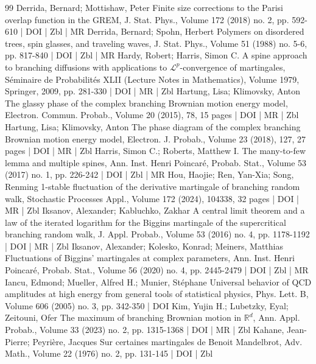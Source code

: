 \documentclass[10pt]{amsart}
\theoremstyle{definition}\newtheorem{defi}[theo]{Definition}\newtheorem{rema}[theo]{Remark}\newtheorem{exam}[theo]{Example}\newtheorem{exem}[theo]{Example}\newtheorem{nota}[theo]{Notation}
\newcommand\1{\mathds{1}}
\begin{document}
\begin{thebibliography}{99}
 Derrida, Bernard; Mottishaw, Peter Finite size corrections to the Parisi overlap function in the GREM, J. Stat. Phys., Volume 172 (2018) no. 2, pp. 592-610 | DOI | Zbl | MR
 Derrida, Bernard; Spohn, Herbert Polymers on disordered trees, spin glasses, and traveling waves, J. Stat. Phys., Volume 51 (1988) no. 5-6, pp. 817-840 | DOI | Zbl | MR
 Hardy, Robert; Harris, Simon C. A spine approach to branching diffusions with applications to $\mathscr{L}^p$-convergence of martingales, Séminaire de Probabilités XLII (Lecture Notes in Mathematics), Volume 1979, Springer, 2009, pp. 281-330 | DOI | MR | Zbl
 Hartung, Lisa; Klimovsky, Anton The glassy phase of the complex branching Brownian motion energy model, Electron. Commun. Probab., Volume 20 (2015), 78, 15 pages | DOI | MR | Zbl
 Hartung, Lisa; Klimovsky, Anton The phase diagram of the complex branching Brownian motion energy model, Electron. J. Probab., Volume 23 (2018), 127, 27 pages | DOI | MR | Zbl
 Harris, Simon C.; Roberts, Matthew I. The many-to-few lemma and multiple spines, Ann. Inst. Henri Poincaré, Probab. Stat., Volume 53 (2017) no. 1, pp. 226-242 | DOI | Zbl | MR
 Hou, Haojie; Ren, Yan-Xia; Song, Renming 1-stable fluctuation of the derivative martingale of branching random walk, Stochastic Processes Appl., Volume 172 (2024), 104338, 32 pages | DOI | MR | Zbl
 Iksanov, Alexander; Kabluchko, Zakhar A central limit theorem and a law of the iterated logarithm for the Biggins martingale of the supercritical branching random walk, J. Appl. Probab., Volume 53 (2016) no. 4, pp. 1178-1192 | DOI | MR | Zbl
 Iksanov, Alexander; Kolesko, Konrad; Meiners, Matthias Fluctuations of Biggins’ martingales at complex parameters, Ann. Inst. Henri Poincaré, Probab. Stat., Volume 56 (2020) no. 4, pp. 2445-2479 | DOI | Zbl | MR
 Iancu, Edmond; Mueller, Alfred H.; Munier, Stéphane Universal behavior of QCD amplitudes at high energy from general tools of statistical physics, Phys. Lett. B, Volume 606 (2005) no. 3, pp. 342-350 | DOI
 Kim, Yujin H.; Lubetzky, Eyal; Zeitouni, Ofer The maximum of branching Brownian motion in $\mathbb{R}^d$, Ann. Appl. Probab., Volume 33 (2023) no. 2, pp. 1315-1368 | DOI | MR | Zbl
 Kahane, Jean-Pierre; Peyrière, Jacques Sur certaines martingales de Benoit Mandelbrot, Adv. Math., Volume 22 (1976) no. 2, pp. 131-145 | DOI | Zbl

\end{thebibliography}
\end{document}

